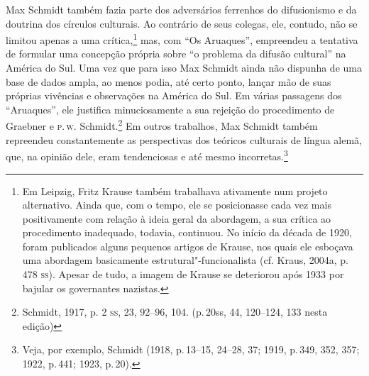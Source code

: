 Max Schmidt também fazia parte dos adversários ferrenhos do
difusionismo e da doutrina dos círculos culturais. Ao contrário de seus
colegas, ele, contudo, não se limitou apenas a uma crítica,\footnote{Em
  Leipzig, Fritz Krause também trabalhava ativamente num projeto
  alternativo. Ainda que, com o tempo, ele se posicionasse cada vez mais
  positivamente com relação à ideia geral da abordagem, a sua crítica ao
  procedimento inadequado, todavia, continuou. No início da década de
  1920, foram publicados alguns pequenos artigos de Krause, nos quais
  ele esboçava uma abordagem basicamente estrutural"-funcionalista (cf.
  Kraus, 2004a, p.\,478 \textsc{ss}). Apesar de tudo, a imagem de Krause se
  deteriorou após 1933 por bajular os governantes nazistas.} mas, com
``Os Aruaques'', empreendeu a tentativa de formular uma concepção
própria sobre ``o problema da difusão cultural'' na América do Sul. Uma
vez que para isso Max Schmidt ainda não dispunha de uma base de dados
ampla, ao menos podia, até certo ponto, lançar mão de suas próprias
vivências e observações na América do Sul. Em várias passagens dos
``Aruaques'', ele justifica minuciosamente a sua rejeição do
procedimento de Graebner e \textsc{p}.\,\textsc{w}. Schmidt.\footnote{Schmidt, 1917, p.
  2 \textsc{ss}, 23, 92--96, 104. (p.\,20ss, 44, 120--124, 133 nesta edição)} Em
outros trabalhos, Max Schmidt também repreendeu constantemente as
perspectivas dos teóricos culturais de língua alemã, que, na opinião
dele, eram tendenciosas e até mesmo incorretas.\footnote{Veja, por
  exemplo, Schmidt (1918, p.\,13--15, 24--28, 37; 1919, p.\,349, 352, 357;
  1922, p.\,441; 1923, p.\,20).}


